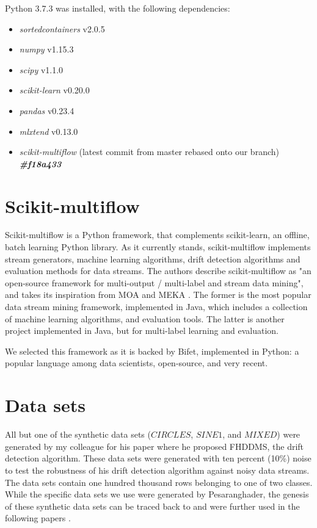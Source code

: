 Python 3.7.3 was installed, with the following dependencies:
\begin{itemize}
\item \textit{sortedcontainers} v2.0.5
\item \textit{numpy} v1.15.3
\item \textit{scipy} v1.1.0
\item \textit{scikit-learn} v0.20.0
\item \textit{pandas} v0.23.4
\item \textit{mlxtend} v0.13.0
\item \textit{scikit-multiflow} (latest commit from master rebased onto our branch) \textit{\textbf{\#f18a433}}
\end{itemize}

\section{Scikit-multiflow}
Scikit-multiflow \cite{skmultiflow} is a Python framework, that complements scikit-learn, an offline, batch learning Python library. As it currently stands, scikit-multiflow implements stream generators, machine learning algorithms, drift detection algorithms and evaluation methods for data streams. The authors describe scikit-multiflow as "an open-source framework for multi-output / multi-label and stream data mining", and takes its inspiration from MOA \cite{bifet2010moa} and MEKA \cite{read2016meka}. The former is the most popular data stream mining framework, implemented in Java, which includes a collection of machine learning algorithms, and evaluation tools. The latter is another project implemented in Java, but for multi-label learning and evaluation.

We selected this framework as it is backed by Bifet, implemented in Python: a popular language among data scientists, open-source, and very recent.

\section{Data sets\label{section:datasets}}
All but one of the synthetic data sets ($CIRCLES$, $SINE1$, and $MIXED$) were generated by my colleague for his paper \cite{pesaranghader2016fast} where he proposed FHDDMS, the drift detection algorithm. These data sets were generated with ten percent (10\%) noise to test the robustness of his drift detection algorithm against noisy data streams. The data sets contain one hundred thousand rows belonging to one of two classes. While the specific data sets we use were generated by Pesaranghader, the genesis of these synthetic data sets can be traced back to \cite{10.1007/3-540-59286-5_74} and were further used in the following papers \cite{baena2006early,bifet2007learning,gama2004learning,nishida2007detecting,olorunnimbe2015intelligent}. %

